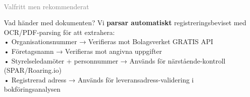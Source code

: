 \documentclass[10pt]{beamer}
\begin{document}
\begin{frame}[label=foretagsdokumentation]
\begin{minipage}{0.48\textwidth}
    \\
    \vspace{0.2cm}
    \footnotesize\textcolor{gray}{Valfritt men rekommenderat}
  \end{minipage}
  
  \vspace{0.3cm}
  \begin{block}{Vad händer med dokumenten?}
    \footnotesize
    Vi \textbf{parsar automatiskt} registreringsbeviset med OCR/PDF-parsing för att extrahera:\\
    • Organisationsnummer → Verifieras mot Bolagsverket GRATIS API\\
    • Företagsnamn → Verifieras mot angivna uppgifter\\
    • Styrelseledamöter + personnummer → Används för närstående-kontroll (SPAR/Roaring.io)\\
    • Registrerad adress → Används för leveransadress-validering i bokföringsanalysen
  \end{block}
  
  \vspace{0.3cm}
  \begin{flushright}
    \hyperlink{bokforing_bank}{}
  \end{flushright}
\end{frame}
\end{document}
